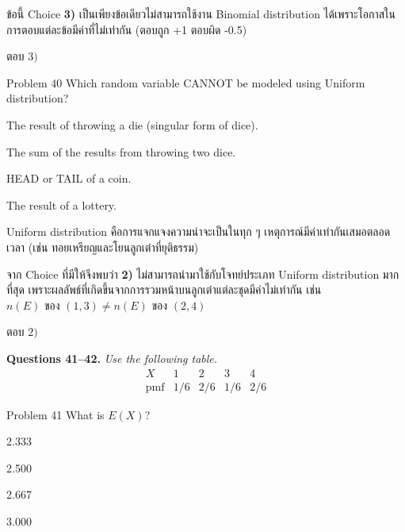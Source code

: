 \documentclass[11pt]{scrartcl}
\newcommand{\groupctx}[2]{\bigskip\noindent\textbf{Questions #1.} \textit{#2}\par\medskip}
\begin{document}
\begin{solutionbox}
  ข้อนี้ Choice \textbf{3)} เป็นเพียงข้อเดียวไม่สามารถใช้งาน Binomial distribution ได้เพราะโอกาสในการตอบแต่ละข้อมีค่าที่ไม่เท่ากัน (ตอบถูก +1 ตอบผิด -0.5)

  ตอบ $\boxed{3)}$
\end{solutionbox}

\begin{problembox}{Problem 40}
Which random variable CANNOT be modeled using Uniform distribution?
 
\begin{choices}
\item The result of throwing a die (singular form of dice).
\item The sum of the results from throwing two dice.
\item HEAD or TAIL of a coin.
\item The result of a lottery.
\end{choices}
\end{problembox}

\begin{solutionbox}
  Uniform distribution คือการแจกแจงความน่าจะเป็นในทุก ๆ เหตุการณ์มีค่าเท่ากันเสมอตลอดเวลา (เช่น ทอยเหรียญและโยนลูกเต๋าที่ยุติธรรม)

  จาก Choice ที่มีให้จึงพบว่า \textbf{2)} ไม่สามารถนำมาใช้กับโจทย์ประเภท Uniform distribution มากที่สุด
  เพราะผลลัพธ์ที่เกิดขึ้นจากการรวมหน้าบนลูกเต๋าแต่ละชุดมีค่าไม่เท่ากัน เช่น $n(E) \text{ ของ } (1,3) \neq n(E) \text{ ของ } (2,4)$
  
  ตอบ $\boxed{2)}$
\end{solutionbox}

\groupctx{41--42}{Use the following table.
\[
\begin{array}{c|cccc}
X & 1 & 2 & 3 & 4 \\
\hline
\text{pmf} & 1/6 & 2/6 & 1/6 & 2/6
\end{array}
\]}
 
\begin{problembox}{Problem 41}
What is $E(X)$?
 
\begin{choices}
\item 2.333
\item 2.500
\item 2.667
\item 3.000
\end{choices}
\end{problembox}
\end{document}
